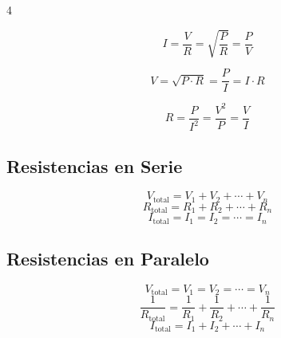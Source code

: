 \documentclass[9pt, landscape, letterpaper]{extarticle}
\begin{document}
\begin{multicols}{4}
  \begin{tablabox}[Intensidad $I$ (A)]
    \tablacompacta
    $$I = \frac{V}{R} = \sqrt{\frac{P}{R}} = \frac{P}{V}$$
  \end{tablabox}

  \begin{tablabox}[Voltaje $V$ (V)]
    \tablacompacta
    $$V = \sqrt{P \cdot R} = \frac{P}{I} = I \cdot R$$
  \end{tablabox}

  \begin{tablabox}
    \tablacompacta
    $$R = \frac{P}{I^2} = \frac{V^2}{P} = \frac{V}{I}$$
  \end{tablabox}

  \subsection{Resistencias en Serie}

  \begin{formulabox}
    $$V_{\text{total}} = V_1 + V_2 + \cdots + V_n$$
    $$R_{\text{total}} = R_1 + R_2 + \cdots + R_n$$
    $$I_{\text{total}} = I_1 = I_2 = \cdots = I_n$$
  \end{formulabox}

  \subsection{Resistencias en Paralelo}

  \begin{formulabox}
    $$V_{\text{total}} = V_1 = V_2 = \cdots = V_n$$
    $$\frac{1}{R_{\text{total}}} = \frac{1}{R_1} + \frac{1}{R_2} + \cdots + \frac{1}{R_n}$$
    $$I_{\text{total}} = I_1 + I_2 + \cdots + I_n$$
  \end{formulabox}



\end{multicols}
\end{document}

